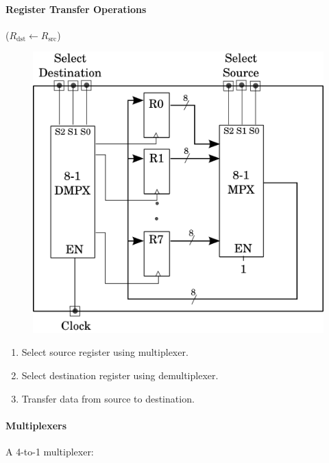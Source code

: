 \documentclass[twocolumn,english]{article}
\begin{document}
\paragraph{Register Transfer Operations}

($R_{\mbox{dst}}\leftarrow R_{\mbox{src}}$)

\begin{figure}[H]
\noindent \centering{}\includegraphics[width=0.225\paperwidth]{img/reg-transfer}
\end{figure}

\begin{enumerate}
\item Select source register using multiplexer.
\item Select destination register using demultiplexer.
\item Transfer data from source to destination.
\end{enumerate}

\paragraph{Multiplexers}

A 4-to-1 multiplexer:
\end{document}
